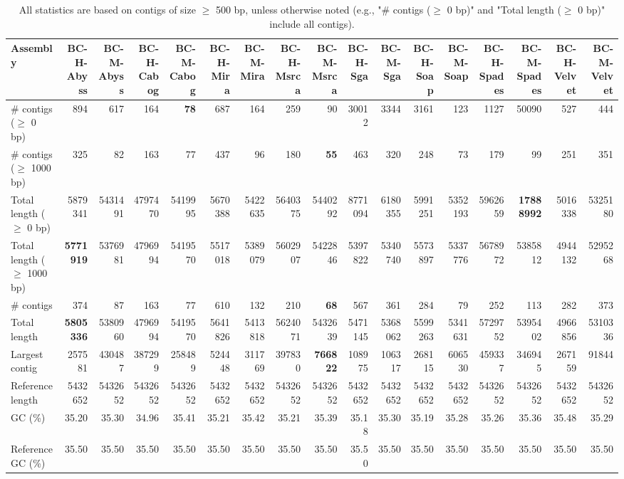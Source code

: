 \documentclass[12pt,a4paper]{article}
\begin{document}
\begin{table}[ht]
\begin{center}
\caption{All statistics are based on contigs of size $\geq$ 500 bp, unless otherwise noted (e.g., "\# contigs ($\geq$ 0 bp)" and "Total length ($\geq$ 0 bp)" include all contigs).}
\begin{tabular}{|l*{16}{|r}|}
\hline
Assembly & BC-H-Abyss & BC-M-Abyss & BC-H-Cabog & BC-M-Cabog & BC-H-Mira & BC-M-Mira & BC-H-Msrca & BC-M-Msrca & BC-H-Sga & BC-M-Sga & BC-H-Soap & BC-M-Soap & BC-H-Spades & BC-M-Spades & BC-H-Velvet & BC-M-Velvet \\ \hline
\# contigs ($\geq$ 0 bp) & 894 & 617 & 164 & {\bf 78} & 687 & 164 & 259 & 90 & 30012 & 3344 & 3161 & 123 & 1127 & 50090 & 527 & 444 \\ \hline
\# contigs ($\geq$ 1000 bp) & 325 & 82 & 163 & 77 & 437 & 96 & 180 & {\bf 55} & 463 & 320 & 248 & 73 & 179 & 99 & 251 & 351 \\ \hline
Total length ($\geq$ 0 bp) & 5879341 & 5431491 & 4797470 & 5419995 & 5670388 & 5422635 & 5640375 & 5440292 & 8771094 & 6180355 & 5991251 & 5352193 & 5962659 & {\bf 17888992} & 5016338 & 5325180 \\ \hline
Total length ($\geq$ 1000 bp) & {\bf 5771919} & 5376981 & 4796994 & 5419570 & 5517018 & 5389079 & 5602907 & 5422846 & 5397822 & 5340740 & 5573897 & 5337776 & 5678972 & 5385812 & 4944132 & 5295268 \\ \hline
\# contigs & 374 & 87 & 163 & 77 & 610 & 132 & 210 & {\bf 68} & 567 & 361 & 284 & 79 & 252 & 113 & 282 & 373 \\ \hline
Total length & {\bf 5805336} & 5380960 & 4796994 & 5419570 & 5641826 & 5413818 & 5624071 & 5432639 & 5471145 & 5368062 & 5599263 & 5341631 & 5729752 & 5395402 & 4966856 & 5310336 \\ \hline
Largest contig & 257581 & 430487 & 387299 & 258489 & 524448 & 311769 & 397830 & {\bf 766822} & 108975 & 106317 & 268115 & 606530 & 459337 & 346945 & 267159 & 91844 \\ \hline
Reference length & 5432652 & 5432652 & 5432652 & 5432652 & 5432652 & 5432652 & 5432652 & 5432652 & 5432652 & 5432652 & 5432652 & 5432652 & 5432652 & 5432652 & 5432652 & 5432652 \\ \hline
GC (\%) & 35.20 & 35.30 & 34.96 & 35.41 & 35.21 & 35.42 & 35.21 & 35.39 & 35.18 & 35.30 & 35.19 & 35.28 & 35.26 & 35.36 & 35.48 & 35.29 \\ \hline
Reference GC (\%) & 35.50 & 35.50 & 35.50 & 35.50 & 35.50 & 35.50 & 35.50 & 35.50 & 35.50 & 35.50 & 35.50 & 35.50 & 35.50 & 35.50 & 35.50 & 35.50 \\ \hline

\end{tabular}
\end{center}
\end{table}
\end{document}
